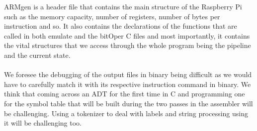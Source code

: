 \documentclass[11pt]{article}
\begin{document}
ARMgen is a header file that contains the main structure of the Raspberry Pi such as the memory capacity, number of registers, number of bytes per instruction and so. It also contains the declarations of the functions that are called in both emulate and the bitOper C files and most importantly, it contains the vital structures that we access through the whole program being the pipeline and the current state.

\paragraph{}
We foresee the debugging of the output files in binary being difficult as we would have to carefully match it with its respective instruction command in binary. We think that coming across an ADT for the first time in C and programming one for the symbol table that will be built during the two passes in the assembler will be challenging. Using a tokenizer to deal with labels and string processing using it will be challenging too. 
\end{document}
